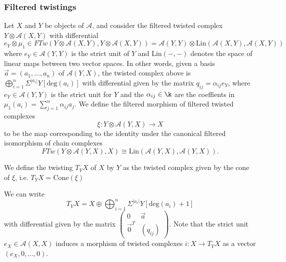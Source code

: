 \subsubsection{Filtered twistings}\label{filtwistings}
Let $X$ and $Y$ be objects of $\mathcal{A}$, and consider the filtered twisted complex $Y\otimes \mathcal{A}(X,Y)$ with differential $$e_Y\otimes \mu_1\in FTw(Y\otimes \mathcal{A}(X,Y),Y\otimes \mathcal{A}(X,Y)) = \mathcal{A}(Y,Y)\otimes \text{Lin}(\mathcal{A}(X,Y), \mathcal{A}(X,Y))$$ where $e_Y\in \mathcal{A}(Y,Y)$ is the strict unit of $Y$ and $\text{Lin}(-,-)$ denotes the space of linear maps between two vector spaces. In other words, given a basis $\vec{a}=(a_1,\ldots, a_n)$ of $\mathcal{A}(Y,X)$, the twisted complex above is $\bigoplus_{i=1}^n \Sigma^{|a_i|}Y[\text{deg}(a_i)]$ with differential given by the matrix $q_{ij} = \alpha_{ij}e_Y$, where $e_Y\in \mathcal{A}(Y,Y)$ is the strict unit for $Y$ and the $\alpha_{ij}\in \k$ are the coeffients in $\mu_1(a_i)=\sum_{j=1}^n\alpha_{ij}a_j$. We define the filtered morphism of filtered twisted complexes $$\xi\colon Y\otimes \mathcal{A}(Y,X)\to X$$ to be the map corresponding to the identity under the canonical filtered isomorphism of chain complexes $$FTw(Y\otimes \mathcal{A}(Y,X), X)\cong \text{Lin}(\mathcal{A}(Y,X),\mathcal{A}(Y,X)).$$ 
\begin{dfn}
	We define the twisting $T_YX$ of $X$ by $Y$ as the twisted complex given by the cone of $\xi$, i.e. $T_YX = \text{Cone}(\xi)$
\end{dfn}
We can write $$T_YX= X\oplus \bigoplus_{i=1}^n \Sigma^{|a_i|}Y[\text{deg}(a_i)+1]$$ with differential given by the matrix $\begin{pmatrix}
	0& \vec{a} \\ \vec{0}^T & (q_{ij})
\end{pmatrix}$.
Note that the strict unit $e_X\in \mathcal{A}(X,X)$ induces a morphism of twisted complexes $i\colon X\to T_YX$ as a vector $(e_X,0,\ldots,0)$.


